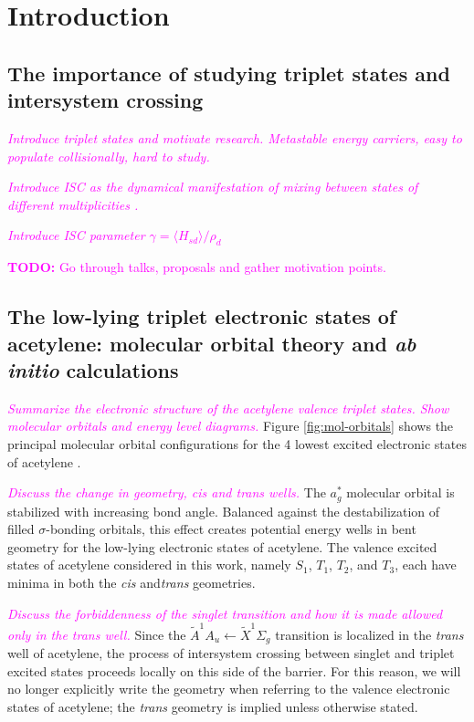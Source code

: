 \documentclass[12pt]{mitthesis}
\newcommand{\TODO} [1]{\textcolor{magenta}{\textbf{TODO:} #1}}
\newcommand{\POINT}[1]{\textcolor{magenta}{\emph{#1}}}
\begin{document}
\tableofcontents
\clearpage

\chapter{Introduction}

\section{The importance of studying triplet states and intersystem
  crossing}

\POINT{Introduce triplet states and motivate research. Metastable
  energy carriers, easy to populate collisionally, hard to study.}

\POINT{Introduce ISC as the dynamical manifestation of mixing between
  states of different multiplicities \cite{kommandeur87, robinson67,
    tramer05}.}

\POINT{Introduce ISC parameter $\gamma = \langle H_{sd} \rangle /
  \rho_d$}

\TODO{Go through talks, proposals and gather motivation points.}

\section{The low-lying triplet electronic states of acetylene:
  molecular orbital theory and \emph{ab initio} calculations}

\POINT{Summarize the electronic structure of the acetylene valence
  triplet states.  Show molecular orbitals and energy level diagrams.}
Figure \ref{fig:mol-orbitals} shows the principal molecular orbital
configurations for the 4 lowest excited electronic states of
acetylene \cite{yamaguchi93}.

\POINT{Discuss the change in geometry, cis and trans wells.}  The
$a_g^*$ molecular orbital is stabilized with increasing  bond
angle.  Balanced against the destabilization of filled
$\sigma$-bonding orbitals, this effect creates potential energy wells
in bent geometry for the low-lying electronic states of acetylene.
The valence excited states of acetylene considered in this work,
namely $S_1$, $T_1$, $T_2$, and $T_3$, each have minima in both the
\emph{cis} and\emph{trans} geometries.

\POINT{Discuss the forbiddenness of the singlet transition and how it
  is made allowed only in the \emph{trans} well.}  Since the
$\tilde{A}^1A_u \leftarrow \tilde{X}^1\Sigma_g$ transition is
localized in the \emph{trans} well of acetylene, the process of
intersystem crossing between singlet and triplet excited states
proceeds locally on this side of the barrier.  For this reason, we
will no longer explicitly write the geometry when referring to the
valence electronic states of acetylene; the \emph{trans} geometry is
implied unless otherwise stated.
\end{document}
